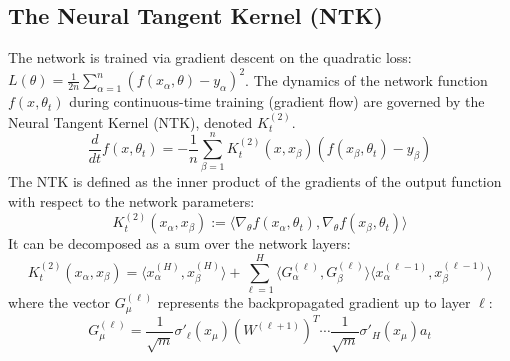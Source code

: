 \documentclass[a4paper]{article}
\begin{document}
\subsection{The Neural Tangent Kernel (NTK)}

The network is trained via gradient descent on the quadratic loss: $L(\theta) = \frac{1}{2n}\sum_{\alpha=1}^n (f(x_\alpha, \theta) - y_\alpha)^2$. The dynamics of the network function $f(x, \theta_t)$ during continuous-time training (gradient flow) are governed by the Neural Tangent Kernel (NTK), denoted $K^{(2)}_t$.
\begin{equation}
\frac{d}{dt} f(x, \theta_t) = -\frac{1}{n}\sum_{\beta=1}^n K^{(2)}_t(x, x_\beta) (f(x_\beta, \theta_t) - y_\beta)
\end{equation}
The NTK is defined as the inner product of the gradients of the output function with respect to the network parameters:
\begin{equation}
K^{(2)}_t(x_\alpha, x_\beta) := \langle \nabla_\theta f(x_\alpha, \theta_t), \nabla_\theta f(x_\beta, \theta_t) \rangle
\end{equation}
It can be decomposed as a sum over the network layers:
\begin{equation}
K^{(2)}_t(x_\alpha, x_\beta) = \langle x^{(H)}_\alpha, x^{(H)}_\beta \rangle + \sum_{\ell=1}^{H} \langle G^{(\ell)}_\alpha, G^{(\ell)}_\beta \rangle \langle x^{(\ell-1)}_\alpha, x^{(\ell-1)}_\beta \rangle
\end{equation}
where the vector $G^{(\ell)}_\mu$ represents the backpropagated gradient up to layer $\ell$:
\begin{equation}
G^{(\ell)}_\mu = \frac{1}{\sqrt{m}}\sigma'_\ell(x_\mu) (W^{(\ell+1)})^T \cdots \frac{1}{\sqrt{m}}\sigma'_H(x_\mu) a_t
\end{equation}
\end{document}
